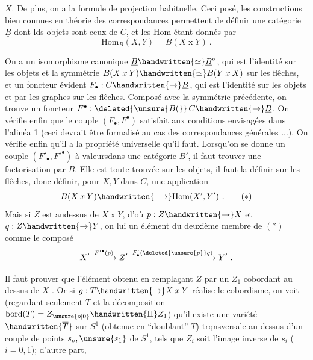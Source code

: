 
$X$. De plus, on a la formule  de projection habituelle. Ceci posé, les constructions bien connues en théorie des correspondances permettent de définir une catégorie $\underline{B}$ dont lds objets sont ceux de $C$, et les $\mathrm{Hom}$ étant donnés par
\[
\mathrm{Hom}_B(X,Y)=B(X\mathbin{x}Y)\ .
\]

On a un isomorphisme canonique $\underline{B}\handwritten{\simeq}\underline{B}^{o}$, qui est l'identité sur les objets et la symmétrie $B(X\mathbin{x}Y)\handwritten{\simeq}B(Y\mathbin{x}X)$ sur les flêches, et un foncteur évident  $F_{\bullet}:C\handwritten{\to}\underline{B}$, qui est l'identité sur les objets et  par les graphes sur les flêches. Composé avec la symmétrie précédente, on trouve un foncteur $F^{\bullet}:\deleted{\unsure{B(}}\,C\handwritten{\to}\underline{B}$. On vérifie enfin que le couple $(F_{\bullet},F^{\bullet})$ satisfait aux conditions envisagées dans l'alinéa 1 (ceci  devrait être formalisé au cas des correspondances générales ...). On vérifie enfin qu'il a la propriété universelle qu'il faut. Lorsqu'on se donne un couple $(F'_{\bullet},F'^{\bullet})$ à valeursdans une catégorie $B'$, il faut trouver une factorisation par $B$. Elle est toute trouvée sur les objets, il faut la définir sur les flêches, donc définir, pour $X,Y$ dans $C$, une application
\begingroup
\makeatletter\tagsleft@true\makeatother
\[
B(X\mathbin{x}Y)\handwritten{\longrightarrow}\mathrm{Hom}(X',Y')\ . \tag*{$(\ast)$}
\]
\endgroup
Mais si $Z$ est audessus de $X\mathbin{x}Y$, d'où $p:Z\handwritten{\to}X$ et $q:Z\handwritten{\to}Y$, on lui  un élément du deuxième membre de $(\ast)$ comme le composé
\[
X'\xrightarrow{F'^{\bullet}(p)} Z'\xrightarrow{F'_{\bullet}(\deleted{\unsure{p}}q)}Y'\ .
\]

Il faut prouver que l'élément obtenu en remplaçant $Z$ par un $Z_1$ cobordant au dessus de $X$ . Or si $g:T\handwritten{\to}X\mathbin{x}Y$ réalise le cobordisme, on voit (regardant seulement $T$ et la décomposition $\mathrm{bord}(T)=Z_{\unsure{o|0}}\handwritten{\amalg}Z_1$) qu'il existe une variété $\handwritten{\overline{T}}$ sur $S^1$ (obtenue en ``doublant'' $T$)  trqnsversale au dessus d'un couple de points $s_o,\unsure{s_1}$ de $S^1$, tels que $Z_i$ soit l'image inverse  de $s_i$ ($i=0,1$); d'autre part,

